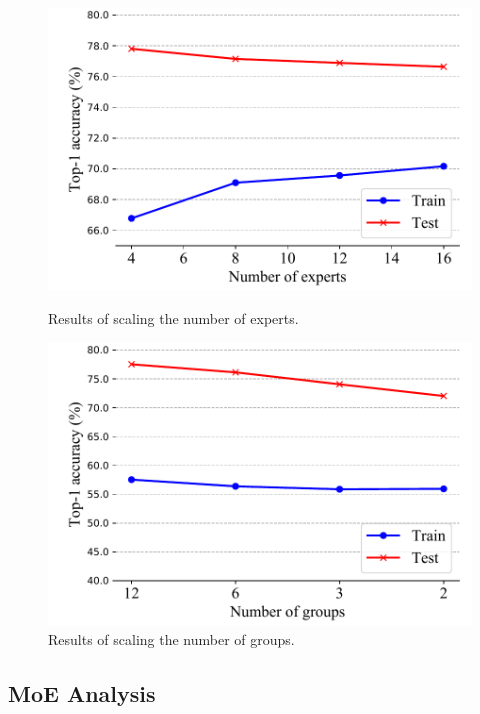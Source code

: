 \documentclass[letterpaper]{article} %
\begin{document}
\begin{figure}
\centering
\begin{minipage}[b]{.45\textwidth}
\includegraphics[width=\textwidth]{num_expert.pdf}
\caption{Results of scaling the number of experts.}\label{fig:num_expert}
\end{minipage}\hfill
\begin{minipage}[b]{.45\textwidth}
\includegraphics[width=\textwidth]{num_groups.pdf}
\caption{Results of scaling the number of groups.}\label{fig:num_group}
\end{minipage}
\end{figure}




\subsection{MoE Analysis} 
\end{document}
